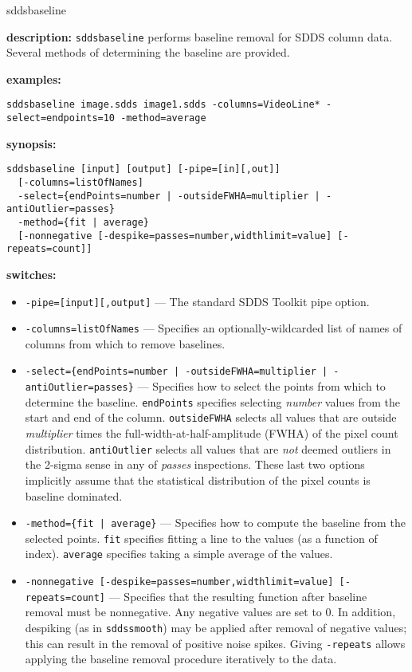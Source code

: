 \begin{sddsprog}{sddsbaseline}
  \item \textbf{description:}
    \verb|sddsbaseline| performs baseline removal for SDDS column data. Several methods of
    determining the baseline are provided.
  \item \textbf{examples:}
  \begin{verbatim}
sddsbaseline image.sdds image1.sdds -columns=VideoLine* -select=endpoints=10 -method=average
  \end{verbatim}
  \item \textbf{synopsis:}
  \begin{verbatim}
sddsbaseline [input] [output] [-pipe=[in][,out]]
  [-columns=listOfNames]
  -select={endPoints=number | -outsideFWHA=multiplier | -antiOutlier=passes}
  -method={fit | average}
  [-nonnegative [-despike=passes=number,widthlimit=value] [-repeats=count]]
  \end{verbatim}
  \item \textbf{switches:}
    \begin{itemize}
      \item \verb|-pipe=[input][,output]| --- The standard SDDS Toolkit pipe option.
      \item \verb|-columns=listOfNames| --- Specifies an optionally-wildcarded list
        of names of columns from which to remove baselines.
      \item \verb!-select={endPoints=number | -outsideFWHA=multiplier | -antiOutlier=passes}! --- Specifies how
        to select the points from which to determine the baseline. \verb|endPoints| specifies selecting \emph{number} values from the start and end of the column. \verb|outsideFWHA| selects all values that are outside \emph{multiplier} times the full-width-at-half-amplitude (FWHA) of the pixel count distribution. \verb|antiOutlier| selects all values that are \emph{not} deemed outliers in the 2-sigma sense in any of \emph{passes} inspections. These last two options implicitly assume that the statistical distribution of the pixel counts is baseline dominated.
      \item \verb!-method={fit | average}! --- Specifies how to compute the baseline from the selected
        points. \verb|fit| specifies fitting a line to the values (as a function of index). \verb|average| specifies taking a simple average of the values.
      \item \verb|-nonnegative [-despike=passes=number,widthlimit=value] [-repeats=count]| --- Specifies that the
        resulting function after baseline removal must be nonnegative. Any negative values are set to 0. In addition, despiking (as in \verb|sddssmooth|) may be applied after removal of negative values; this can result in the removal of positive noise spikes. Giving \verb|-repeats| allows applying the baseline removal procedure iteratively to the data.

\end{itemize}
\end{sddsprog}
